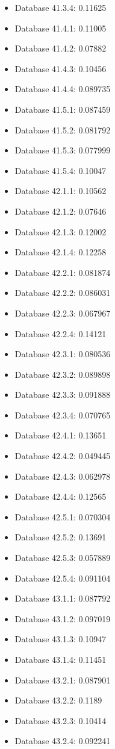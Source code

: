 \begin{itemize}
\item Database 41.3.4: 0.11625
\item Database 41.4.1: 0.11005
\item Database 41.4.2: 0.07882
\item Database 41.4.3: 0.10456
\item Database 41.4.4: 0.089735
\item Database 41.5.1: 0.087459
\item Database 41.5.2: 0.081792
\item Database 41.5.3: 0.077999
\item Database 41.5.4: 0.10047
\item Database 42.1.1: 0.10562
\item Database 42.1.2: 0.07646
\item Database 42.1.3: 0.12002
\item Database 42.1.4: 0.12258
\item Database 42.2.1: 0.081874
\item Database 42.2.2: 0.086031
\item Database 42.2.3: 0.067967
\item Database 42.2.4: 0.14121
\item Database 42.3.1: 0.080536
\item Database 42.3.2: 0.089898
\item Database 42.3.3: 0.091888
\item Database 42.3.4: 0.070765
\item Database 42.4.1: 0.13651
\item Database 42.4.2: 0.049445
\item Database 42.4.3: 0.062978
\item Database 42.4.4: 0.12565
\item Database 42.5.1: 0.070304
\item Database 42.5.2: 0.13691
\item Database 42.5.3: 0.057889
\item Database 42.5.4: 0.091104
\item Database 43.1.1: 0.087792
\item Database 43.1.2: 0.097019
\item Database 43.1.3: 0.10947
\item Database 43.1.4: 0.11451
\item Database 43.2.1: 0.087901
\item Database 43.2.2: 0.1189
\item Database 43.2.3: 0.10414
\item Database 43.2.4: 0.092241

\end{itemize}
